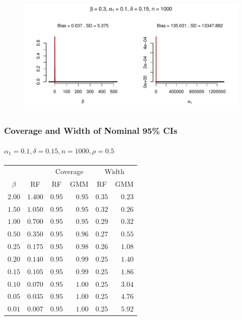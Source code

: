 \documentclass{beamer}
\begin{document}
\begin{frame}[plain,c]

  \begin{figure}[h]
    \centering
    \includegraphics[width=\textwidth]{Rplot11}
  \end{figure}

\end{frame}
\begin{frame}
  \frametitle{Coverage and Width of Nominal 95\% CIs}
  \framesubtitle{$\alpha_1 = 0.1, \delta = 0.15, n = 1000, \rho = 0.5$}
\begin{table}[!tbp]
  \small
\centering
\begin{tabular}{rrrrrr}
\hline\hline
&& \multicolumn{2}{c}{Coverage} & \multicolumn{2}{c}{Width}\\
\multicolumn{1}{c}{$\beta$}&\multicolumn{1}{c}{RF}&\multicolumn{1}{c}{RF}&\multicolumn{1}{c}{GMM}&\multicolumn{1}{c}{RF}&\multicolumn{1}{c}{GMM}\tabularnewline
\hline
$2.00$&$1.400$&$0.95$&$0.95$&$0.35$&$0.23$\tabularnewline
$1.50$&$1.050$&$0.95$&$0.95$&$0.32$&$0.26$\tabularnewline
$1.00$&$0.700$&$0.95$&$0.95$&$0.29$&$0.32$\tabularnewline
$0.50$&$0.350$&$0.95$&$0.96$&$0.27$&$0.55$\tabularnewline
$0.25$&$0.175$&$0.95$&$0.98$&$0.26$&$1.08$\tabularnewline
$0.20$&$0.140$&$0.95$&$0.99$&$0.25$&$1.40$\tabularnewline
$0.15$&$0.105$&$0.95$&$0.99$&$0.25$&$1.86$\tabularnewline
$0.10$&$0.070$&$0.95$&$1.00$&$0.25$&$3.04$\tabularnewline
$0.05$&$0.035$&$0.95$&$1.00$&$0.25$&$4.76$\tabularnewline
$0.01$&$0.007$&$0.95$&$1.00$&$0.25$&$5.92$\tabularnewline
\hline
\end{tabular}
\end{table}
\end{frame}
\end{document}
